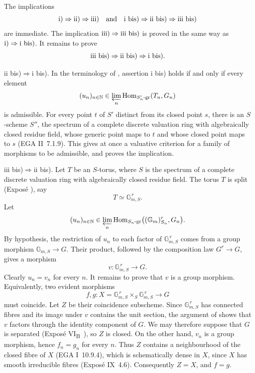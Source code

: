 The implications
\[
 \textup{i)}\Rightarrow\textup{ii)}\Rightarrow\textup{iii)}
 \quad\text{and}\quad
 \textup{i bis)}\Rightarrow\textup{ii bis)}
 \Rightarrow\textup{iii bis)}
\]
are immediate. The implication
\(\textup{iii)}\Rightarrow\textup{iii bis)}\) is proved in the same
way as
\(\textup{i)}\Rightarrow\textup{i bis)}\).
It remains to prove
\[
 \textup{iii bis)}\Rightarrow\textup{ii bis)}
 \Rightarrow\textup{i bis)}.
\]

\textup{ii bis)}\(\Rightarrow\)\textup{i bis)}.
In the terminology of , assertion \textup{i bis)} holds if and
only if every element
\[
 (u_n)_{n\in\mathbb N}\in
 \varprojlim_n\operatorname{Hom}_{S'_n\text{-gr}}(T_n,G_n)
\]
is admissible. For every point \(t\) of \(S'\) distinct from its
closed point \(s\), there is an \(S\)-scheme \(S''\), the spectrum of
a complete discrete valuation ring with algebraically closed residue
field, whose generic point maps to \(t\) and whose closed point maps
to \(s\) (EGA II~7.1.9). This gives at once a valuative criterion for
a family of morphisms to be admissible, and proves the implication.

\textup{iii bis)}\(\Rightarrow\)\textup{ii bis)}.
Let \(T\) be an \(S\)-torus, where \(S\) is the spectrum of a complete
discrete valuation ring with algebraically closed residue field. The
torus \(T\) is split (Exposé ), say
\[
  T\simeq\mathbb G_{m,S}^{\,r}.
\]
Let
\[
 (u_n)_{n\in\mathbb N}\in
 \varprojlim_n
 \operatorname{Hom}_{S_n\text{-gr}}
 \bigl((\mathbb G_m)^r_{S_n},G_n\bigr).
\]
By hypothesis, the restriction of \(u_n\) to each factor of
\(\mathbb G_{m,S}^{\,r}\) comes from a group morphism
\(\mathbb G_{m,S}\to G\). Their product, followed by the composition
law \(G^r\to G\), gives a morphism
\[
  v:\mathbb G_{m,S}^{\,r}\longrightarrow G.
\]
Clearly \(u_n=v_n\) for every \(n\). It remains to prove that \(v\)
is a group morphism. Equivalently, two evident morphisms
\[
 f,g:X=\mathbb G_{m,S}^{\,r}\times_S\mathbb G_{m,S}^{\,r}
 \longrightarrow G
\]
must coincide. Let \(Z\) be their coincidence subscheme. Since
\(\mathbb G_{m,S}^{\,r}\) has connected fibres and its image under
\(v\) contains the unit section, the argument of  shows
that \(v\) factors through the identity component of \(G\). We may
therefore suppose that \(G\) is separated
(Exposé VI\textsubscript{B}~), so \(Z\) is closed. On the other
hand, \(v_n\) is a group morphism, hence \(f_n=g_n\) for every \(n\).
Thus \(Z\) contains a neighbourhood of the closed fibre of \(X\)
(EGA I~10.9.4), which is schematically dense in \(X\), since \(X\)
has smooth irreducible fibres (Exposé IX~4.6). Consequently
\(Z=X\), and \(f=g\).

